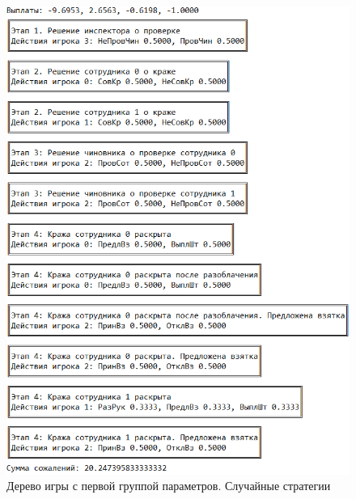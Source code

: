 \begin{figure}[H]
	\centering
	\includegraphics[width=0.8\linewidth]{inc/img/c32th11}
	\caption{Дерево игры с первой группой параметров. Случайные стратегии}
	\label{fig:c32th11}
\end{figure}

